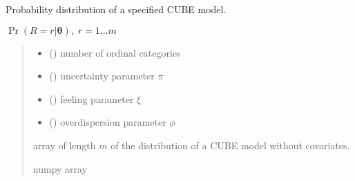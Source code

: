 \documentclass[letterpaper,10pt,english]{sphinxmanual}
\begin{document}
\begin{fulllineitems}
\label{\detokenize{cubmods:cubmods.cube.pmf}}
\pysigstartsignatures
{}
\pysigstopsignatures
\sphinxAtStartPar
Probability distribution of a specified CUBE model.

\sphinxAtStartPar
\(\Pr(R = r | \pmb\theta),\; r=1 \ldots m\)
\begin{quote}\begin{description}
\begin{itemize}
\item {} 
\sphinxAtStartPar
{} () \textendash{} number of ordinal categories

\item {} 
\sphinxAtStartPar
{} () \textendash{} uncertainty parameter \(\pi\)

\item {} 
\sphinxAtStartPar
{} () \textendash{} feeling parameter \(\xi\)

\item {} 
\sphinxAtStartPar
{} () \textendash{} overdispersion parameter \(\phi\)

\end{itemize}

\sphinxAtStartPar
array of length \(m\) of the distribution of a CUBE model without covariates.

\sphinxAtStartPar
numpy array

\end{description}\end{quote}

\end{fulllineitems}

\end{document}
